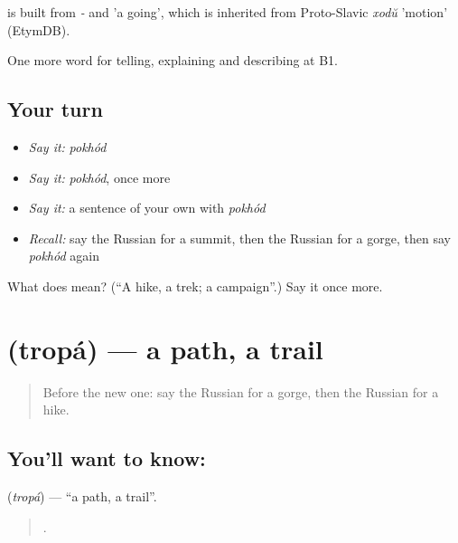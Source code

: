 \begin{cousinweb}
\emph{} is built from \emph{-} and \emph{} 'a going', which is inherited from Proto-Slavic \emph{xodŭ} 'motion' (EtymDB).
\end{cousinweb}

\begin{grammarlens}[title={What you've built}]
One more word for telling, explaining and describing at B1.
\end{grammarlens}

\subsection*{Your turn}
\begin{itemize}
\raggedright
  \item \emph{Say it:} \emph{pokhód}
  \item \emph{Say it:} \emph{pokhód}, once more
  \item \emph{Say it:} a sentence of your own with \emph{pokhód}
  \item \emph{Recall:} say the Russian for a summit, then the Russian for a gorge, then say \emph{pokhód} again
\end{itemize}

\begin{tcolorbox}[breakable,colback=teal!4,colframe=teal!35!black,title={Before you move on}]
What does  mean? (\textquotedblleft{}A hike, a trek; a campaign\textquotedblright{}.) Say it once more.
\end{tcolorbox}
\section[\texorpdfstring{\ru{тропа} (tropá)}{тропа (tropá)}]{ (tropá) — a path, a trail}

\label{lesson:RU-C459-tropa}



\begin{quote}
Before the new one: say the Russian for a gorge, then the Russian for a hike.
\end{quote}

\subsection*{You'll want to know: }
\textbf{} (\emph{tropá}) — \textquotedblleft{}a path, a trail\textquotedblright{}.

\begin{quote}
    .
\end{quote}

